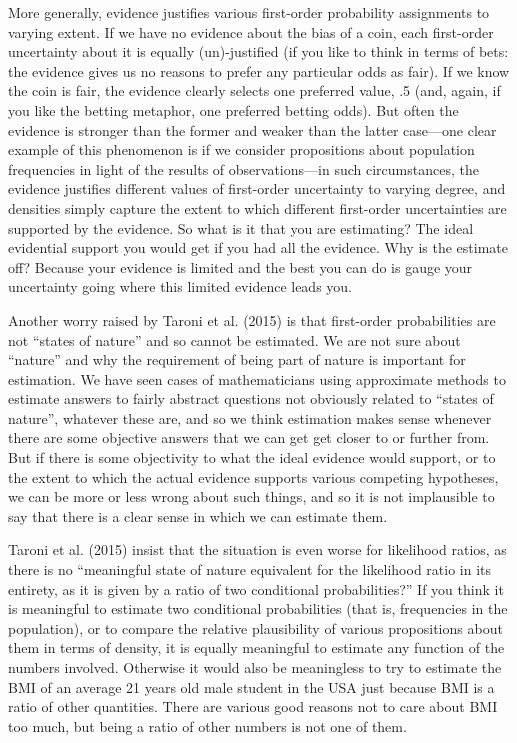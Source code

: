 \documentclass[
  10pt,
  dvipsnames,enabledeprecatedfontcommands]{scrartcl}
\begin{document}
More generally, evidence justifies various first-order probability
assignments to varying extent. If we have no evidence about the bias of
a coin, each first-order uncertainty about it is equally (un)-justified
(if you like to think in terms of bets: the evidence gives us no reasons
to prefer any particular odds as fair). If we know the coin is fair, the
evidence clearly selects one preferred value, .5 (and, again, if you
like the betting metaphor, one preferred betting odds). But often the
evidence is stronger than the former and weaker than the latter
case---one clear example of this phenomenon is if we consider
propositions about population frequencies in light of the results of
observations---in such circumstances, the evidence justifies different
values of first-order uncertainty to varying degree, and densities
simply capture the extent to which different first-order uncertainties
are supported by the evidence. So what is it that you are estimating?
The ideal evidential support you would get if you had all the evidence.
Why is the estimate off? Because your evidence is limited and the best
you can do is gauge your uncertainty going where this limited evidence
leads you.

Another worry raised by Taroni et al. (2015) is that first-order
probabilities are not ``states of nature'' and so cannot be estimated.
We are not sure about ``nature'' and why the requirement of being part
of nature is important for estimation. We have seen cases of
mathematicians using approximate methods to estimate answers to fairly
abstract questions not obviously related to ``states of nature'',
whatever these are, and so we think estimation makes sense whenever
there are some objective answers that we can get get closer to or
further from. But if there is some objectivity to what the ideal
evidence would support, or to the extent to which the actual evidence
supports various competing hypotheses, we can be more or less wrong
about such things, and so it is not implausible to say that there is a
clear sense in which we can estimate them.

Taroni et al. (2015) insist that the situation is even worse for
likelihood ratios, as there is no ``meaningful state of nature
equivalent for the likelihood ratio in its entirety, as it is given by a
ratio of two conditional probabilities?'' If you think it is meaningful
to estimate two conditional probabilities (that is, frequencies in the
population), or to compare the relative plausibility of various
propositions about them in terms of density, it is equally meaningful to
estimate any function of the numbers involved. Otherwise it would also
be meaningless to try to estimate the BMI of an average 21 years old
male student in the USA just because BMI is a ratio of other quantities.
There are various good reasons not to care about BMI too much, but being
a ratio of other numbers is not one of them.
\end{document}
